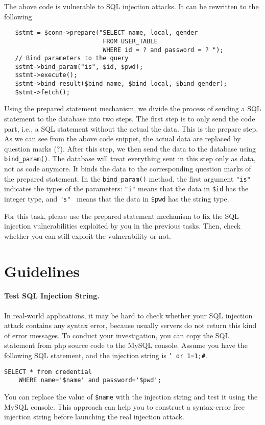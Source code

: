 The above code is vulnerable to SQL injection attacks. 
It can be rewritten to the following


\begin{lstlisting}
   $stmt = $conn->prepare("SELECT name, local, gender
                           FROM USER_TABLE 
                           WHERE id = ? and password = ? ");
   // Bind parameters to the query
   $stmt->bind_param("is", $id, $pwd);
   $stmt->execute();
   $stmt->bind_result($bind_name, $bind_local, $bind_gender);
   $stmt->fetch();
\end{lstlisting}


Using the prepared statement mechanism, we divide the process of sending
a SQL statement to the database into two steps.  
The first step is to only send the code part, i.e., a SQL statement without 
the actual the data. This is the prepare step. As we can see from the 
above code snippet, the actual data are replaced by question
marks (?).  After this step, we then send the data to the database using 
{\tt bind\_param()}.
The database will treat everything sent in this step only as 
data, not as code anymore. It binds the data to the corresponding
question marks of the prepared statement. 
In the {\tt bind\_param()} method, the first argument {\tt "is"} indicates
the types of the parameters: \texttt{"i"} means  
that the data in {\tt \$id} has the integer type,
and \texttt{"s" } means that the data in {\tt \$pwd} has the string type.


For this task, please use the prepared statement mechanism to 
fix the SQL injection vulnerabilities exploited by you in the previous tasks. 
Then, check whether you can still exploit the vulnerability or not. 


\section{Guidelines}
\label{sec:guidelines}

\paragraph{Test SQL Injection String.}
In real-world applications, it may be hard to check whether your SQL injection attack contains
any syntax error, because usually servers do not return this kind of error messages. 
To conduct your investigation, you can copy the SQL statement from php source code to the MySQL console. 
Assume you have the following SQL statement, and the injection string is {\tt ' or 1=1;\#}. 
\begin{verbatim}
SELECT * from credential 
	WHERE name='$name' and password='$pwd';
\end{verbatim} 
You can replace the value of {\tt \$name} with the
injection string and test it using the MySQL console. 
This approach can help you to construct a syntax-error 
free injection string before launching the real injection attack. 


